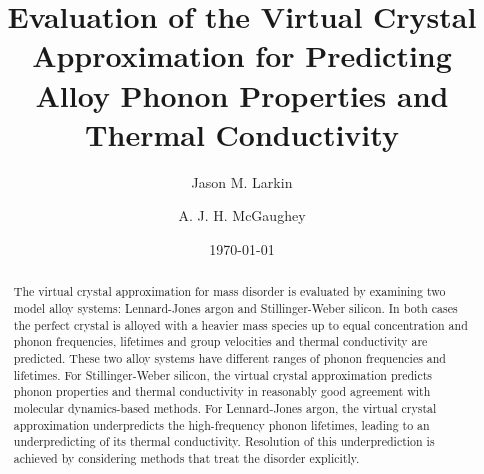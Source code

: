 \documentclass[aps,prb,onecolumn,preprint,footinbib,superscriptaddress,amsmath,amssymb,floatfix]{revtex4}
\begin{document}

\title{Evaluation of the Virtual Crystal Approximation for Predicting Alloy 
Phonon Properties and Thermal Conductivity}
\author{Jason M. Larkin}
\author{A. J. H. McGaughey}

\date{\today}


\begin{abstract}
The virtual crystal approximation for mass disorder is 
evaluated by examining two model alloy systems: Lennard-Jones argon 
and Stillinger-Weber silicon. In both cases the perfect crystal is 
alloyed with a heavier mass species up to equal concentration and 
phonon frequencies, lifetimes and group velocities and thermal 
conductivity are predicted. These 
two alloy systems have different ranges of phonon frequencies and 
lifetimes.
For Stillinger-Weber silicon, the 
virtual crystal approximation predicts phonon properties and thermal 
conductivity in reasonably good agreement with molecular 
dynamics-based methods. For Lennard-Jones argon, the virtual crystal 
approximation underpredicts 
the high-frequency phonon lifetimes, leading to an underpredicting of 
its thermal conductivity. Resolution of this underprediction is achieved 
by considering methods that treat the disorder explicitly. 
\end{abstract}


\maketitle
\clearpage
\end{document}
